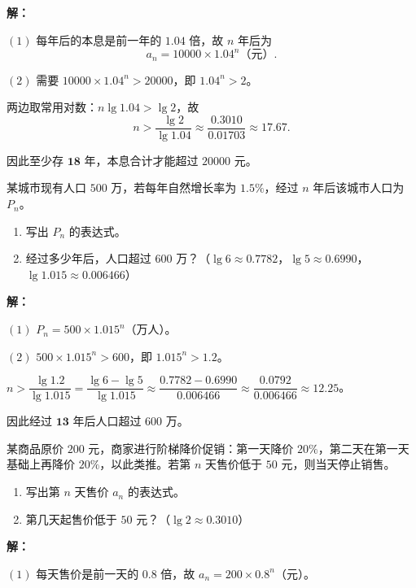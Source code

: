 \documentclass[12pt, a4paper]{ctexart}
\begin{document}
\noindent\textbf{解：}

$(1)$ 每年后的本息是前一年的 $1.04$ 倍，故 $n$ 年后为
\[
  a_n = 10000 \times 1.04^n \text{（元）}.
\]

$(2)$ 需要 $10000 \times 1.04^n > 20000$，即 $1.04^n > 2$。

两边取常用对数：$n \lg 1.04 > \lg 2$，故
\[
  n > \frac{\lg 2}{\lg 1.04} \approx \frac{0.3010}{0.01703} \approx 17.67.
\]

因此至少存 $\mathbf{18}$ 年，本息合计才能超过 $20000$ 元。

\begin{appbox}[【应用2】人口增长问题]
某城市现有人口 $500$ 万，若每年自然增长率为 $1.5\%$，经过 $n$ 年后该城市人口为 $P_n$。
\begin{enumerate}[label=(\arabic*)]
  \item 写出 $P_n$ 的表达式。
  \item 经过多少年后，人口超过 $600$ 万？（$\lg 6 \approx 0.7782$，$\lg 5 \approx 0.6990$，$\lg 1.015 \approx 0.006466$）
\end{enumerate}
\end{appbox}

\noindent\textbf{解：}

$(1)$ $P_n = 500 \times 1.015^n$（万人）。

$(2)$ $500 \times 1.015^n > 600$，即 $1.015^n > 1.2$。

$n > \dfrac{\lg 1.2}{\lg 1.015} = \dfrac{\lg 6 - \lg 5}{\lg 1.015} \approx \dfrac{0.7782 - 0.6990}{0.006466} \approx \dfrac{0.0792}{0.006466} \approx 12.25$。

因此经过 $\mathbf{13}$ 年后人口超过 $600$ 万。

\begin{appbox}[【应用3】阶梯降价促销]
某商品原价 $200$ 元，商家进行阶梯降价促销：第一天降价 $20\%$，第二天在第一天基础上再降价 $20\%$，以此类推。若第 $n$ 天售价低于 $50$ 元，则当天停止销售。
\begin{enumerate}[label=(\arabic*)]
  \item 写出第 $n$ 天售价 $a_n$ 的表达式。
  \item 第几天起售价低于 $50$ 元？（$\lg 2 \approx 0.3010$）
\end{enumerate}
\end{appbox}

\noindent\textbf{解：}

$(1)$ 每天售价是前一天的 $0.8$ 倍，故 $a_n = 200 \times 0.8^n$（元）。
\end{document}
